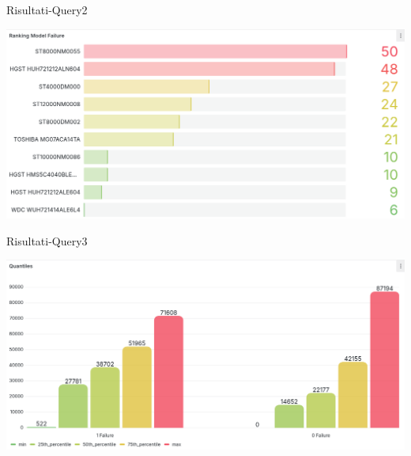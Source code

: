 \documentclass[13pt,aspectratio=169,t,xcolor=table]{beamer}
\begin{document}
\begin{frame}{Risultati-Query2}
    \begin{minipage}{0.9\textwidth}
        \begin{adjustbox}{margin=1cm 0cm 1.5cm 0cm, center}
            \includegraphics[width=1\textwidth]{res/query2_panel2.png}
        \end{adjustbox}
    \end{minipage}
\end{frame}

\begin{frame}{Risultati-Query3}
    \begin{minipage}{0.9\textwidth}
        \begin{adjustbox}{margin=1cm 0cm 1.5cm 0cm, center}
            \includegraphics[width=1\textwidth]{res/query3_panel1.png}
        \end{adjustbox}
    \end{minipage}
\end{frame}
\end{document}
